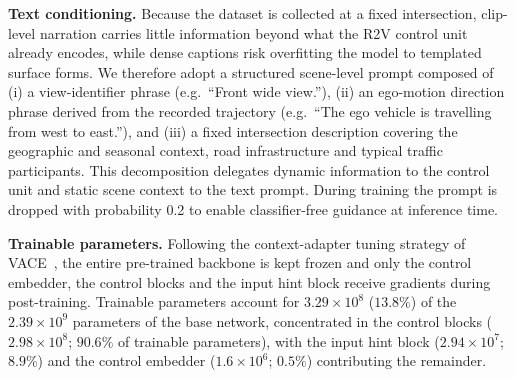 \textbf{Text conditioning.}
Because the dataset is collected at a fixed intersection,
clip-level narration carries little information beyond what
the R2V control unit already encodes, while dense captions
risk overfitting the model to templated surface forms. We
therefore adopt a structured scene-level prompt composed of
(i) a view-identifier phrase (e.g.\ ``Front wide view.''),
(ii) an ego-motion direction phrase derived from the recorded
trajectory (e.g.\ ``The ego vehicle is travelling from west
to east.''), and (iii) a fixed intersection description
covering the geographic and seasonal context, road
infrastructure and typical traffic participants. This
decomposition delegates dynamic information to the control
unit and static scene context to the text prompt. During
training the prompt is dropped with probability 0.2 to enable
classifier-free guidance at inference time.

\textbf{Trainable parameters.}
Following the context-adapter tuning strategy of
VACE~\cite{jiang2025vace}, the entire pre-trained backbone is
kept frozen and only the control embedder, the control blocks
and the input hint block receive gradients during
post-training. Trainable parameters account for
$3.29\!\times\!10^{8}$ ($13.8\%$) of the
$2.39\!\times\!10^{9}$ parameters of the base network,
concentrated in the control blocks ($2.98\!\times\!10^{8}$;
$90.6\%$ of trainable parameters), with the input hint block
($2.94\!\times\!10^{7}$; $8.9\%$) and the control embedder
($1.6\!\times\!10^{6}$; $0.5\%$) contributing the remainder.
